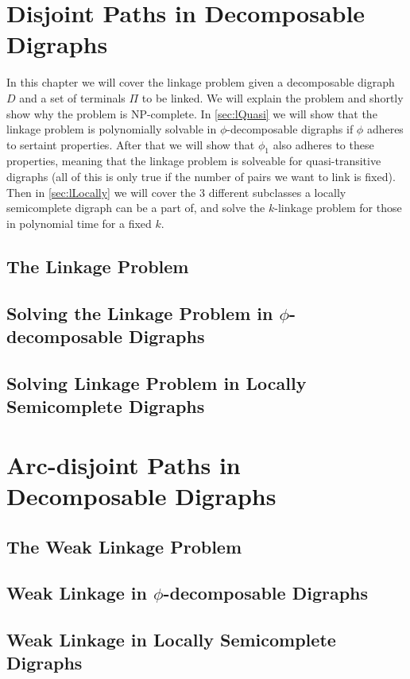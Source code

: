 \chapter{Disjoint Paths in Decomposable Digraphs}
\label{chap:linkage}
In this chapter we will cover the linkage problem given a decomposable digraph $D$ and a set of terminals $\Pi$ to be linked. 
We will explain the problem and shortly show why the problem is NP-complete. 
In \autoref{sec:lQuasi} we will show that the linkage problem is polynomially solvable in $\phi$-decomposable digraphs if $\phi$ adheres to sertaint properties. 
After that we will show that $\phi_1$ also adheres to these properties, meaning that the linkage problem is solveable for quasi-transitive digraphs (all of this is only true if the number of pairs we want to link is fixed). Then in \autoref{sec:lLocally} we will cover the 3 different subclasses a locally semicomplete digraph can be a part of, and solve the $k$-linkage problem for those in polynomial time for a fixed $k$. 
\section{The Linkage Problem}
\label{sec:lNP}


\section{Solving the Linkage Problem in $\phi$-decomposable Digraphs}
\label{sec:lQuasi}


\section{Solving Linkage Problem in Locally Semicomplete Digraphs}
\label{sec:lLocally}


\chapter{Arc-disjoint Paths in Decomposable Digraphs}
\label{chap:weak}

\section{The Weak Linkage Problem}
\label{sec:wNP}


\section{Weak Linkage in $\phi$-decomposable Digraphs}
\label{sec:wQuasi}


\section{Weak Linkage in Locally Semicomplete Digraphs}
\label{sec:wLocally}


